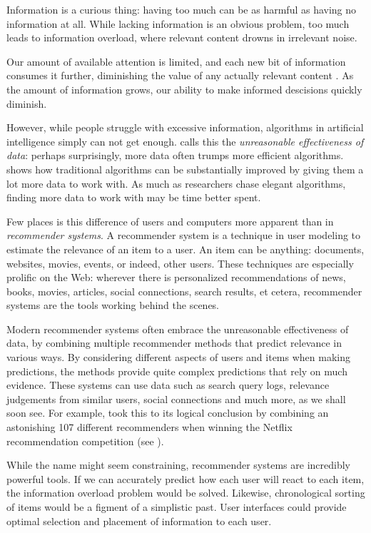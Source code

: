 \label{chap:intro}

Information is a curious thing:
having too much can be as harmful as having no information at all.
While lacking information is an obvious problem,
too much leads to information overload,
where relevant content drowns in irrelevant noise.

Our amount of available attention is limited, and each new bit
of information consumes it further,
diminishing the value of any actually relevant content
\cite[p1]{Davenport2001}.
As the amount of information grows,
our ability to make informed descisions quickly diminish.

However, while people struggle with excessive information,
algorithms in artificial intelligence simply can not get enough.
\citet[p1]{Halevy2009} calls this the \emph{unreasonable effectiveness of data}:
perhaps surprisingly, more data often trumps more efficient algorithms.
\citet[p3]{Banko2001} shows how traditional algorithms can be substantially
improved by giving them a lot more data to work with.
As much as researchers chase elegant algorithms,
finding more data to work with may be time better spent.

Few places is this difference of users and computers more apparent than in \emph{recommender systems}.
A recommender system is a technique in user modeling to estimate the relevance of an item to a user.
An item can be anything: documents, websites, movies, events, or indeed, other users.
These techniques are especially prolific on the Web: 
wherever there is personalized recommendations of news, books, movies,
articles, social connections, search results, et cetera, recommender systems are the tools
working behind the scenes.

Modern recommender systems often embrace the unreasonable effectiveness of data,
by combining multiple recommender methods that predict relevance in various ways.
By considering different aspects of users and items when making predictions,
the methods provide quite complex predictions that rely on much evidence.
These systems can use data such as search query logs, relevance judgements from similar users,
social connections and much more, as we shall soon see.
For example, \citet[p1]{Bell2007} took this to its logical conclusion by 
combining an astonishing 107 different recommenders when winning the Netflix recommendation competition
(see \citet{Linden2009}).

While the name might seem constraining, recommender systems are incredibly powerful tools.
If we can accurately predict how each user will react to each item, the information overload problem would be solved.
Likewise, chronological sorting of items would be a figment of a simplistic past.
User interfaces could provide optimal selection and placement of information to each user.

